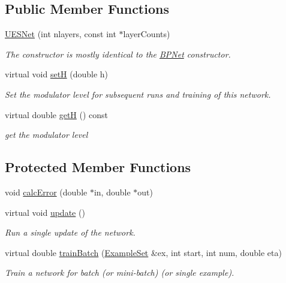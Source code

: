 \subsection*{Public Member Functions}
\begin{DoxyCompactItemize}
\item 
\hyperlink{classUESNet_a8ce49ce5f9785756347b67e2ab4f7d1e}{U\+E\+S\+Net} (int nlayers, const int $\ast$layer\+Counts)
\begin{DoxyCompactList}\small\item\em The constructor is mostly identical to the \hyperlink{classBPNet}{B\+P\+Net} constructor. \end{DoxyCompactList}\item 
virtual void \hyperlink{classUESNet_ad05de4582dd40ae714fce3f9b0d3d2ca}{setH} (double h)
\begin{DoxyCompactList}\small\item\em Set the modulator level for subsequent runs and training of this network. \end{DoxyCompactList}\item 
virtual double \hyperlink{classUESNet_a421efc8741f28e65931e2b8affa7c149}{getH} () const 
\begin{DoxyCompactList}\small\item\em get the modulator level \end{DoxyCompactList}\end{DoxyCompactItemize}
\subsection*{Protected Member Functions}
\begin{DoxyCompactItemize}
\item 
void \hyperlink{classUESNet_afce4ee930898f0b93c147167adc9bac6}{calc\+Error} (double $\ast$in, double $\ast$out)
\item 
virtual void \hyperlink{classUESNet_a1d05fcd3ce9f188db8841a9d6fc6c56c}{update} ()
\begin{DoxyCompactList}\small\item\em Run a single update of the network. \end{DoxyCompactList}\item 
virtual double \hyperlink{classUESNet_ac27da7319d8be1507ea80506e69437e5}{train\+Batch} (\hyperlink{classExampleSet}{Example\+Set} \&ex, int start, int num, double eta)
\begin{DoxyCompactList}\small\item\em Train a network for batch (or mini-\/batch) (or single example). \end{DoxyCompactList}\end{DoxyCompactItemize}
